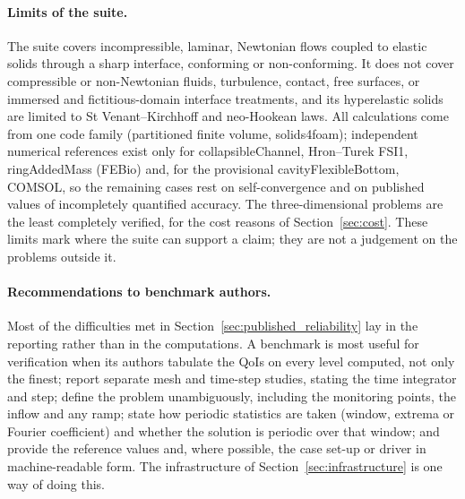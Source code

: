 \paragraph{Limits of the suite.}
The suite covers incompressible, laminar, Newtonian flows coupled to elastic solids through a sharp interface, conforming or non-conforming.
It does not cover compressible or non-Newtonian fluids, turbulence, contact, free surfaces, or immersed and fictitious-domain interface treatments, and its hyperelastic solids are limited to St Venant--Kirchhoff and neo-Hookean laws.
All calculations come from one code family (partitioned finite volume, solids4foam); independent numerical references exist only for collapsibleChannel, Hron--Turek FSI1, ringAddedMass (FEBio) and, for the provisional cavityFlexibleBottom, COMSOL, so the remaining cases rest on self-convergence and on published values of incompletely quantified accuracy.
The three-dimensional problems are the least completely verified, for the cost reasons of Section~\ref{sec:cost}.
These limits mark where the suite can support a claim; they are not a judgement on the problems outside it.

\paragraph{Recommendations to benchmark authors.}
Most of the difficulties met in Section~\ref{sec:published_reliability} lay in the reporting rather than in the computations.
A benchmark is most useful for verification when its authors tabulate the QoIs on every level computed, not only the finest; report separate mesh and time-step studies, stating the time integrator and step; define the problem unambiguously, including the monitoring points, the inflow and any ramp; state how periodic statistics are taken (window, extrema or Fourier coefficient) and whether the solution is periodic over that window; and provide the reference values and, where possible, the case set-up or driver in machine-readable form.
The infrastructure of Section~\ref{sec:infrastructure} is one way of doing this.
